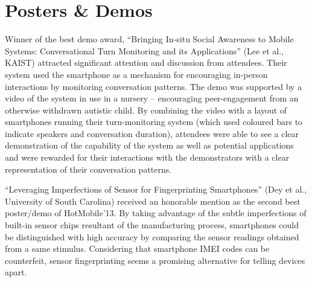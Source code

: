 \section{Posters \& Demos}
\label{sec:postersdemos}
Winner of the best demo award, ``Bringing In-situ Social Awareness to Mobile 
Systems: Conversational Turn Monitoring and its Applications'' (Lee et al., 
KAIST) attracted significant attention and discussion from attendees. Their 
system used the smartphone as a mechanism for encouraging in-person interactions
by monitoring conversation patterns. The demo was supported by a video of the 
system in use in a nursery -- encouraging peer-engagement from an otherwise 
withdrawn autistic child. By combining the video with a layout of smartphones 
running their turn-monitoring system (which used coloured bars to indicate 
speakers and conversation duration), attendees were able to see a clear 
demonstration of the capability of the system as well as potential applications
and were rewarded for their interactions with the demonstrators with a clear
representation of their conversation patterns.

``Leveraging Imperfections of Sensor for Fingerprinting Smartphones''
(Dey et al., University of South Carolina) received an honorable mention
as the second best poster/demo of HotMobile'13. By taking advantage of
the subtle imperfections of built-in sensor chips resultant of the
manufacturing process, smartphones could be distinguished with high
accuracy by comparing the sensor readings obtained from a same stimulus.
Considering that smartphone IMEI codes can be counterfeit, sensor
fingerprinting seems a promising alternative for telling devices apart.


